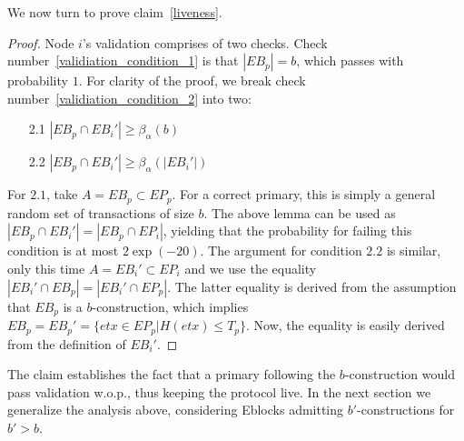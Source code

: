 \noindent We now turn to prove claim~\ref{liveness}. 
\begin{proof}
Node $i$'s validation comprises of two checks. Check number~\ref{validiation_condition_1} is that $|EB_p|=b$, which passes with probability $1$. For clarity of the proof, we break check number~\ref{validiation_condition_2} into two:
\begin{enumerate}
	\item[2.1] $|EB_p\cap EB_i'|\geq \beta_{\alpha}(b)$ 
	\item[2.2] $|EB_p\cap EB_i'|\geq \beta_{\alpha}(|EB_i'|)$
\end{enumerate}
For $2.1$, take $A=EB_p\subset EP_p$. For a correct primary, this is simply a general random set of transactions of size $b$. The above lemma can be used as $|EB_p\cap EB_i'|=|EB_p\cap EP_i|$, yielding that the probability for failing this condition is at most $2\exp(-20)$.
The argument for condition $2.2$ is similar, only this time $A=EB_i'\subset EP_i$ and we use the equality $|EB_i'\cap EB_p |=|EB_i'\cap EP_p|$. The latter equality is derived from the assumption that $EB_p$ is a $b$-construction, which implies $EB_p=EB_p'=\{etx\in EP_p|H(etx)\leq T_p\}$. Now, the equality is easily derived from the definition of $EB_i'$.
\end{proof}

 
The claim establishes the fact that a primary following the $b$-construction would pass validation w.o.p., thus keeping the protocol live. 
In the next section we generalize the analysis above, considering Eblocks admitting $b'$-constructions for $b'>b$.





